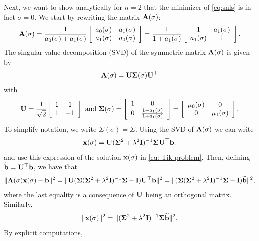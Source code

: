 \documentclass[onefignum,onetabnum]{siamart171218}
\newcommand{\bA}{{\bf A}}
\newcommand{\bI}{{\bf I}}
\newcommand{\bU}{{\bf U}}
\newcommand{\bb}{{\bf b}}
\newcommand{\bx}{{\bf x}}
\newcommand{\bSigma}{{\bf \Sigma}}
\begin{document}
Next, we want to show analytically for $n=2$ that the minimizer of \eqref{eq:snls} is in fact $\sigma=0$. 
We start by rewriting the matrix $\bA(\sigma)$:
\begin{equation*}\bA(\sigma) = \frac{1}{a_0(\sigma)+a_1(\sigma)}\left[ \begin{array}{cc} a_0(\sigma) & a_1(\sigma) \\ a_1(\sigma) & a_0(\sigma)\end{array}\right] =  \frac{1}{1+a_1(\sigma)}\left[ \begin{array}{cc} 1 & a_1(\sigma) \\ a_1(\sigma) & 1\end{array}\right]. \end{equation*} The singular value decomposition (SVD) of the symmetric matrix $\bA(\sigma)$ is given by 
\[\bA(\sigma) = \bU \bSigma (\sigma) \bU^\top\] 
with 
\begin{equation*}\bU = \frac{1}{\sqrt{2}}\left[\begin{array}{cc} 1 & 1 \\ 1 & -1\end{array} \right] \mbox{ and } \bSigma (\sigma) = \left[\begin{array}{cc} 1 & 0 \\ 0 & \frac{1-a_1(\sigma)}{1+a_1(\sigma)}\end{array} \right] = \left[\begin{array}{cc} \mu_0(\sigma) & 0 \\ 0 & \mu_1(\sigma)\end{array} \right].\end{equation*}
To simplify notation, we write $\Sigma(\sigma)=\Sigma$.
Using the SVD of $\bA(\sigma)$ we can write
\begin{equation*}\bx(\sigma) = \bU (\bSigma^2 + \lambda^2 \bI)^{-1} \bSigma \bU^{\top} \bb.\end{equation*}
and use this expression of the solution $\bx(\sigma)$ in \eqref{eq: Tik-problem}. Then, defining $\widetilde{\bb} = \bU^\top \bb$, we have that
\begin{align*}
\| \bA(\sigma) \bx(\sigma) - \bb\|^2 = 
\| \bU (\bSigma (\bSigma^2 + \lambda^2 \bI)^{-1} \bSigma  - \bI) \bU^{\top} \bb\|^2= \| (\bSigma (\bSigma^2 + \lambda^2 \bI)^{-1} \bSigma  - \bI) \widetilde{\bb}\|^2, 
\end{align*}
where the last equality is a consequence of $\bU$ being an orthogonal matrix. Similarly,
\[ \| \bx(\sigma)\|^2 = \| (\bSigma^2 + \lambda^2 \bI)^{-1} \bSigma \widetilde{\bb} \|^2.\]
By explicit computations, 
\end{document}
